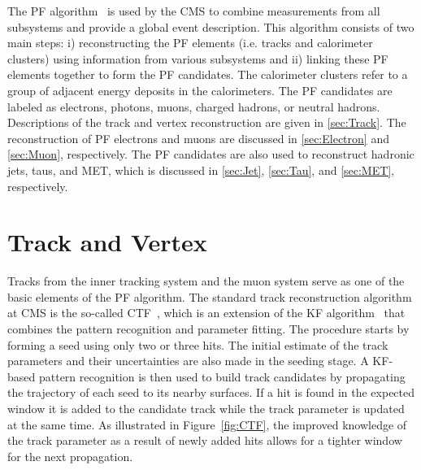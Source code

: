 The \ac{PF} algorithm~\cite{CMS:2017yfk} is used by the \ac{CMS} to combine measurements from all subsystems and provide a global event description. This algorithm consists of two main steps: i) reconstructing the \ac{PF} elements (i.e. tracks and calorimeter clusters) using information from various subsystems and ii) linking these \ac{PF} elements together to form the \ac{PF} candidates. The calorimeter clusters refer to a group of adjacent energy deposits in the calorimeters. The \ac{PF} candidates are labeled as electrons, photons, muons, charged hadrons, or neutral hadrons. Descriptions of the track and vertex reconstruction are given in \autoref{sec:Track}. The reconstruction of \ac{PF} electrons and muons are discussed in \autoref{sec:Electron} and \autoref{sec:Muon}, respectively. The \ac{PF} candidates are also used to reconstruct hadronic jets, taus, and \ac{MET}, which is discussed in \autoref{sec:Jet}, \autoref{sec:Tau}, and \autoref{sec:MET}, respectively.

\section{Track and Vertex}
\label{sec:Track}

Tracks from the inner tracking system and the muon system serve as one of the basic elements of the \ac{PF} algorithm. The standard track reconstruction algorithm at \ac{CMS} is the so-called \ac{CTF}~\cite{Speer:2005dp}, which is an extension of the \ac{KF} algorithm~\cite{Fruhwirth:1987fm} that combines the pattern recognition and parameter fitting. The procedure starts by forming a seed using only two or three hits. The initial estimate of the track parameters and their uncertainties are also made in the seeding stage. A \ac{KF}-based pattern recognition is then used to build track candidates by propagating the trajectory of each seed to its nearby surfaces. If a hit is found in the expected window it is added to the candidate track while the track parameter is updated at the same time. As illustrated in Figure~\ref{fig:CTF}, the improved knowledge of the track parameter as a result of newly added hits allows for a tighter window for the next propagation. 

